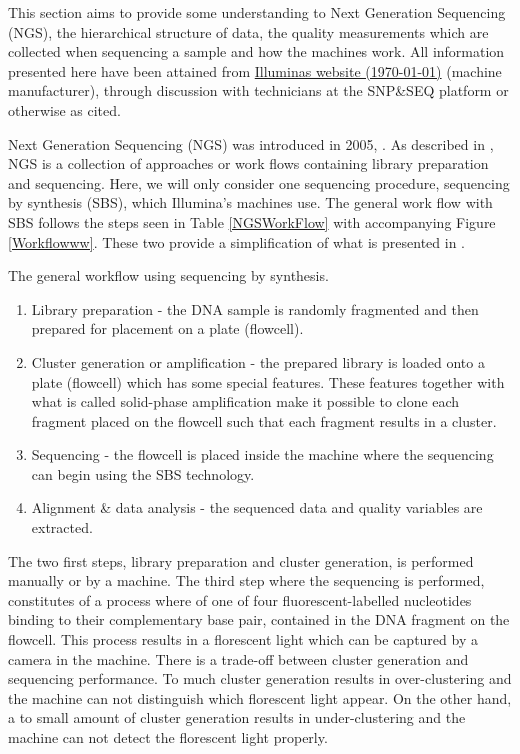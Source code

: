 This section aims to provide some understanding to Next Generation Sequencing (NGS), the hierarchical structure of data, the quality measurements which are collected when sequencing a sample and how the machines work. All information presented here have been attained from \href{https://support.illumina.com/}{Illuminas website (\today)} (machine manufacturer), through discussion with technicians at the SNP\&SEQ platform or otherwise as cited. 

Next Generation Sequencing (NGS) was introduced in 2005, \citet{NGS}. As described in \citet{NATUREseq}, NGS is a collection of approaches or work flows containing library preparation and sequencing. Here, we will only consider one sequencing procedure, sequencing by synthesis (SBS), which Illumina's machines use. The general work flow with SBS follows the steps seen in Table \ref{NGSWorkFlow} with accompanying Figure \ref{Workflowww}. These two provide a simplification of what is presented in \citet{NGS}. 
\begin{table}[!ht]
\caption{The general workflow using sequencing by synthesis.\label{NGSWorkFlow}}
\begin{enumerate}
\item Library preparation - the DNA sample is randomly fragmented and then prepared for placement on a plate (flowcell).
\item Cluster generation or amplification - the prepared library is loaded onto a plate (flowcell) which has some special features. 
These features together with what is called solid-phase amplification make it possible to clone each fragment placed on the flowcell such that each fragment results in a cluster.
\item Sequencing - the flowcell is placed inside the machine where the sequencing can begin using the SBS technology. 
\item Alignment \& data analysis - the sequenced data and quality variables are extracted. 
\end{enumerate}
\end{table}

The two first steps, library preparation and cluster generation, is performed manually or by a machine. The third step where the sequencing is performed, constitutes of a process where of one of four fluorescent-labelled nucleotides binding to their complementary base pair, contained in the DNA fragment on the flowcell. This process results in a florescent light which can be captured by a camera in the machine. There is a trade-off between cluster generation and sequencing performance. To much cluster generation results in over-clustering and the machine can not distinguish which florescent light appear. On the other hand, a to small amount of cluster generation results in under-clustering and the machine can not detect the florescent light properly.
 
